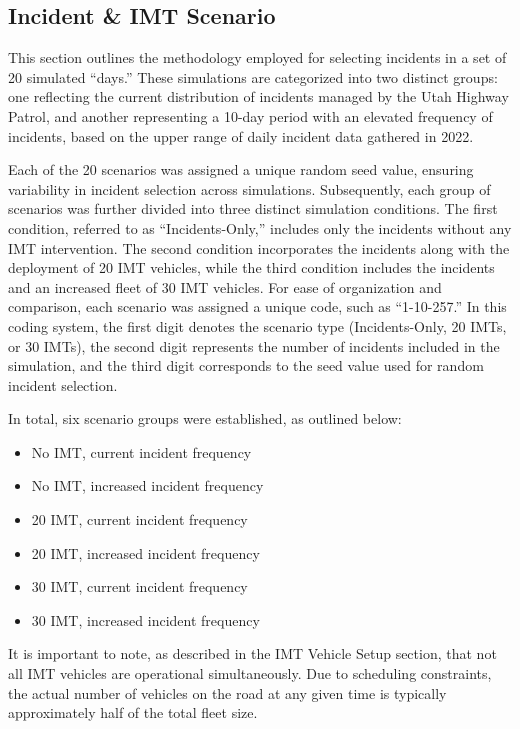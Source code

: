 \documentclass[fancy, oneside, mastersfancy, ms]{byuthesis}
\providecommand{\tightlist}{%
  \setlength{\itemsep}{0pt}\setlength{\parskip}{0pt}}\usepackage{longtable,booktabs,array}
\begin{document}
\hypertarget{incident-imt-scenario}{%
\subsection{Incident \& IMT Scenario}\label{incident-imt-scenario}}

This section outlines the methodology employed for selecting incidents
in a set of 20 simulated ``days.'' These simulations are categorized
into two distinct groups: one reflecting the current distribution of
incidents managed by the Utah Highway Patrol, and another representing a
10-day period with an elevated frequency of incidents, based on the
upper range of daily incident data gathered in 2022.

Each of the 20 scenarios was assigned a unique random seed value,
ensuring variability in incident selection across simulations.
Subsequently, each group of scenarios was further divided into three
distinct simulation conditions. The first condition, referred to as
``Incidents-Only,'' includes only the incidents without any IMT
intervention. The second condition incorporates the incidents along with
the deployment of 20 IMT vehicles, while the third condition includes
the incidents and an increased fleet of 30 IMT vehicles. For ease of
organization and comparison, each scenario was assigned a unique code,
such as ``1-10-257.'' In this coding system, the first digit denotes the
scenario type (Incidents-Only, 20 IMTs, or 30 IMTs), the second digit
represents the number of incidents included in the simulation, and the
third digit corresponds to the seed value used for random incident
selection.

In total, six scenario groups were established, as outlined below:

\begin{itemize}
\tightlist
\item
  No IMT, current incident frequency
\item
  No IMT, increased incident frequency
\item
  20 IMT, current incident frequency
\item
  20 IMT, increased incident frequency
\item
  30 IMT, current incident frequency
\item
  30 IMT, increased incident frequency
\end{itemize}

It is important to note, as described in the IMT Vehicle Setup section,
that not all IMT vehicles are operational simultaneously. Due to
scheduling constraints, the actual number of vehicles on the road at any
given time is typically approximately half of the total fleet size.
\end{document}

